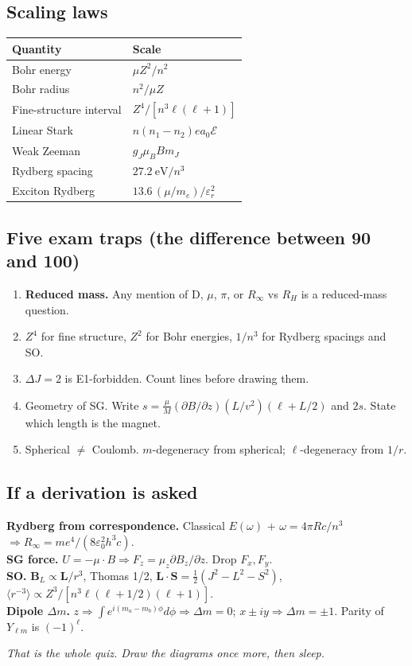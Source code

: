 \documentclass[11pt,a4paper]{article}
\begin{document}
\subsection*{Scaling laws}
\begin{center}
\begin{tabular}{@{}ll@{}}
\toprule
Quantity & Scale \\
\midrule
Bohr energy & \(\mu Z^2/n^2\) \\
Bohr radius & \(n^2/\mu Z\) \\
Fine-structure interval & \(Z^4/[n^3\ell(\ell+1)]\) \\
Linear Stark & \(n(n_1-n_2)e a_0\mathcal{E}\) \\
Weak Zeeman & \(g_J\mu_B B m_J\) \\
Rydberg spacing & \(27.2~\mathrm{eV}/n^3\) \\
Exciton Rydberg & \(13.6\,(\mu/m_e)/\varepsilon_r^2\) \\
\bottomrule
\end{tabular}
\end{center}

\subsection*{Five exam traps (the difference between 90 and 100)}
\begin{enumerate}
\item \textbf{Reduced mass.} Any mention of D, \(\mu\), \(\pi\), or \(R_\infty\) vs \(R_H\) is a reduced-mass question.
\item \(Z^4\) for fine structure, \(Z^2\) for Bohr energies, \(1/n^3\) for Rydberg spacings and SO.
\item \(\Delta J=2\) is E1-forbidden. Count lines before drawing them.
\item Geometry of SG. Write \(s=\frac{\mu}{M}(\partial B/\partial z)(L/v^2)(\ell+L/2)\) and \(2s\). State which length is the magnet.
\item Spherical \(\neq\) Coulomb. \(m\)-degeneracy from spherical; \(\ell\)-degeneracy from \(1/r\).
\end{enumerate}

\subsection*{If a derivation is asked}
\textbf{Rydberg from correspondence.} Classical \(E(\omega)\) + \(\omega=4\pi Rc/n^3\) \(\Rightarrow R_\infty=me^4/(8\varepsilon_0^2 h^3 c)\).\\
\textbf{SG force.} \(U=-\mu\cdot B\Rightarrow F_z=\mu_z\partial B_z/\partial z\). Drop \(F_x,F_y\).\\
\textbf{SO.} \(\mathbf{B}_L\propto\mathbf{L}/r^3\), Thomas 1/2, \(\mathbf{L}\cdot\mathbf{S}=\tfrac12(J^2-L^2-S^2)\), \(\langle r^{-3}\rangle\propto Z^3/[n^3\ell(\ell+1/2)(\ell+1)]\).\\
\textbf{Dipole \(\Delta m\).} \(z\Rightarrow\int e^{i(m_a-m_b)\phi}d\phi\Rightarrow\Delta m=0\); \(x\pm iy\Rightarrow\Delta m=\pm 1\). Parity of \(Y_{\ell m}\) is \((-1)^\ell\).

\vspace{1.2em}
\begin{center}
\textit{That is the whole quiz. Draw the diagrams once more, then sleep.}
\end{center}
\end{document}
